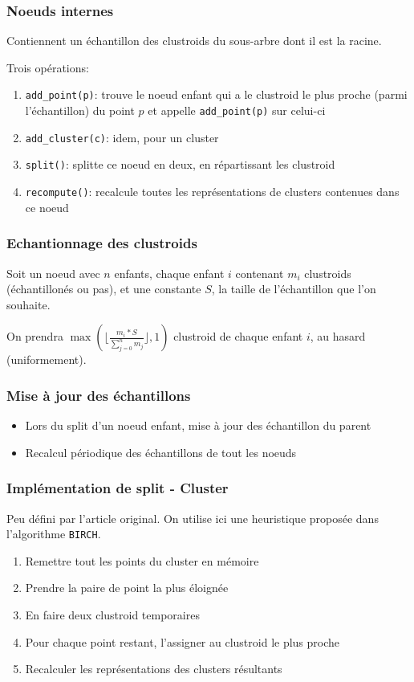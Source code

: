 \documentclass{beamer}
\begin{document}
 	\begin{frame}
 		\frametitle{Noeuds internes}
 		Contiennent un échantillon des clustroids du sous-arbre dont il est la racine.
 		
 		Trois opérations:
 		\begin{enumerate}
 			\item \texttt{add\_point(p)}: trouve le noeud enfant qui a le clustroid le plus proche (parmi l'échantillon) du point $p$ et appelle \texttt{add\_point(p)} sur celui-ci
 			\item \texttt{add\_cluster(c)}: idem, pour un cluster
 			\item \texttt{split()}: splitte ce noeud en deux, en répartissant les clustroid
 			\item \texttt{recompute()}: recalcule toutes les représentations de clusters contenues dans ce noeud
 		\end{enumerate}
 	\end{frame}
 	
 	\begin{frame}
 		\frametitle{Echantionnage des clustroids}
 		Soit un noeud avec $n$ enfants, chaque enfant $i$ contenant $m_i$ clustroids (échantillonés ou pas), et une constante $S$, la taille de l'échantillon que l'on souhaite.
 		
 		On prendra $\max(\lfloor\frac{m_i*S}{\sum_{j=0}^n m_j}\rfloor,1)$ clustroid de chaque enfant $i$, au hasard (uniformement).
 	\end{frame}
 	
 	\begin{frame}
 		\frametitle{Mise à jour des échantillons}
 		\begin{itemize}
 			\item Lors du split d'un noeud enfant, mise à jour des échantillon du parent
 			\item Recalcul périodique des échantillons de tout les noeuds
 		\end{itemize}
 	\end{frame}
 	
 	\begin{frame}
 		\frametitle{Implémentation de split - Cluster}
 		Peu défini par l'article original. On utilise ici une heuristique proposée dans l'algorithme \texttt{BIRCH}.
 		\begin{enumerate}
 			\item Remettre tout les points du cluster en mémoire
 			\item Prendre la paire de point la plus éloignée
 			\item En faire deux clustroid temporaires
 			\item Pour chaque point restant, l'assigner au clustroid le plus proche
 			\item Recalculer les représentations des clusters résultants
 		\end{enumerate}
 	\end{frame}
 	
\end{document}
